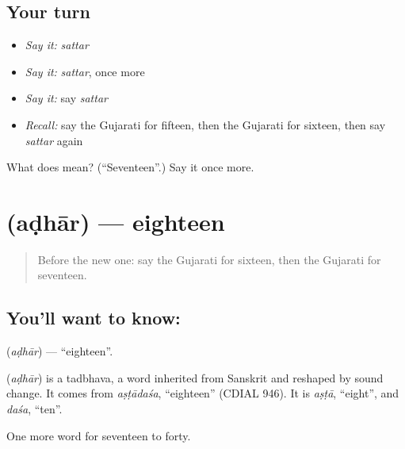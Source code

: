 \subsection*{Your turn}
\begin{itemize}
\raggedright
  \item \emph{Say it:} \emph{sattar}
  \item \emph{Say it:} \emph{sattar}, once more
  \item \emph{Say it:} say \emph{sattar}
  \item \emph{Recall:} say the Gujarati for fifteen, then the Gujarati for sixteen, then say \emph{sattar} again
\end{itemize}

\begin{tcolorbox}[breakable,colback=teal!4,colframe=teal!35!black,title={Before you move on}]
What does  mean? (\textquotedblleft{}Seventeen\textquotedblright{}.) Say it once more.
\end{tcolorbox}
\section[\texorpdfstring{\gu{અઢાર} (aḍhār)}{અઢાર (aḍhār)}]{ (aḍhār) — eighteen}

\label{lesson:GU-C82-eighteen}



\begin{quote}
Before the new one: say the Gujarati for sixteen, then the Gujarati for seventeen.
\end{quote}

\subsection*{You'll want to know: }
\textbf{} (\emph{aḍhār}) — \textquotedblleft{}eighteen\textquotedblright{}.

\begin{cousinweb}
\textbf{} (\emph{aḍhār}) is a tadbhava, a word inherited from Sanskrit and reshaped by sound change. It comes from \emph{aṣṭādaśa}, \textquotedblleft{}eighteen\textquotedblright{} (CDIAL 946). It is \emph{aṣṭā}, \textquotedblleft{}eight\textquotedblright{}, and \emph{daśa}, \textquotedblleft{}ten\textquotedblright{}.
\end{cousinweb}

\begin{grammarlens}[title={What you've built}]
One more word for seventeen to forty.
\end{grammarlens}

